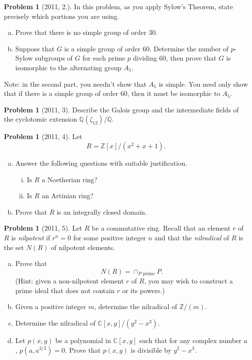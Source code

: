 \documentclass{article}
\newcommand{\<}{\langle} %
\renewcommand{\>}{\rangle} %
\theoremstyle{plain}
\theoremstyle{remark}
\theoremstyle{definition}
\newcounter{question}
\newtheorem{examproblem}[equation]{Problem}
\begin{document}
\begin{examproblem}[2011, 2.]
	In this problem, as you apply Sylow's Theorem, state precisely which portions
	you are using.
	\begin{enumerate}[(a)]
		\item Prove that there is no simple group of order 30.
		\item Suppose that $G$ is a simple group of order 60. Determine
			the number of $p$-Sylow subgroups of $G$ for each prime
			$p$ dividing 60, then prove that $G$ is isomorphic to
			the alternating group $A_5$.
	\end{enumerate}
	Note: in the second part, you needn't show that $A_5$ is simple.
	You need only show that if there is a simple group of order 60, then
	it must be isomorphic to $A_5$.
\end{examproblem}

\begin{examproblem}[2011, 3]
	Describe the Galois group and the intermediate fields of the cyclotomic
	extension $\mathbb Q(\zeta_{12})/\mathbb Q$.
\end{examproblem}



\begin{examproblem}[2011, 4]
	Let
	$$
	R=\mathbb Z[x]/(x^2+x+1).
	$$
	\begin{enumerate}[(a)]
		\item Answer the following questions with suitable justification.
			\begin{enumerate}[(i)]
				\item Is $R$ a Noetherian ring?
				\item Is $R$ an Artinian ring?
			\end{enumerate}
		\item Prove that $R$ is an integrally closed domain.
	\end{enumerate}
\end{examproblem}

\begin{examproblem}[2011, 5]
	Let $R$ be a commutative ring. Recall that an element $r$ of $R$ is
	\textit{nilpotent} if $r^n=0$ for some positive integer $n$ and that
	the \textit{nilradical} of $R$ is the set $N(R)$ of nilpotent
	elements.
	\begin{enumerate}[(a)]
		\item Prove that
			$$
			N(R)=\cap_{P\text{ prime}}P.
			$$
			(Hint: given a non-nilpotent element $r$ of $R$, you may
			wish to construct a prime ideal that does not
			contain $r$ or its powers.)
		\item Given a positive integer $m$, determine the nilradical
			of $\mathbb Z/(m)$.
		\item Determine the nilradical of $\mathbb C[x,y]/(y^2-x^3)$.
		\item Let $p(x,y)$ be a polynomial in $\mathbb C[x,y]$ such that
			for any complex number $a$, $p(a,a^{3/2})=0$. Prove that
			$p(x,y)$ is divisible by $y^2-x^3$.
	\end{enumerate}
\end{examproblem}
\end{document}
